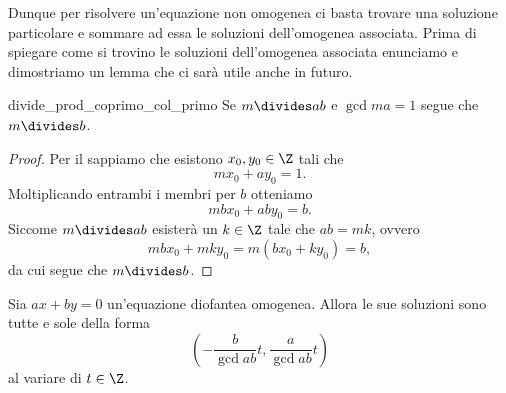 Dunque per risolvere un'equazione non omogenea ci basta trovare una soluzione particolare e sommare ad essa le soluzioni dell'omogenea associata. Prima di spiegare come si trovino le soluzioni dell'omogenea associata enunciamo e dimostriamo un lemma che ci sarà utile anche in futuro.

\begin{lemma} {divide_prod_coprimo_col_primo}
    Se $m \divides ab$ e $\gcd{m}{a} = 1$ segue che $m \divides b$.
\end{lemma}
\begin{proof}
    Per il  sappiamo che esistono $x_0, y_0 \in \Z$ tali che \[
        mx_0 + ay_0 = 1.    
    \] Moltiplicando entrambi i membri per $b$ otteniamo \[
        mbx_0 + aby_0 = b.    
    \] Siccome $m \divides ab$ esisterà un $k \in \Z$ tale che $ab = mk$, ovvero \[
        mbx_0 + mky_0 = m(bx_0 + ky_0) = b,     
    \] da cui segue che $m \divides b$.
\end{proof}

\begin{proposition}
    Sia $ax+by = 0$ un'equazione diofantea omogenea. Allora le sue soluzioni sono tutte e sole della forma \begin{equation}
        \left(-\frac{b}{\gcd{a}{b}}t, \frac{a}{\gcd{a}{b}}t \right)
    \end{equation} al variare di $t \in \Z$.
\end{proposition}